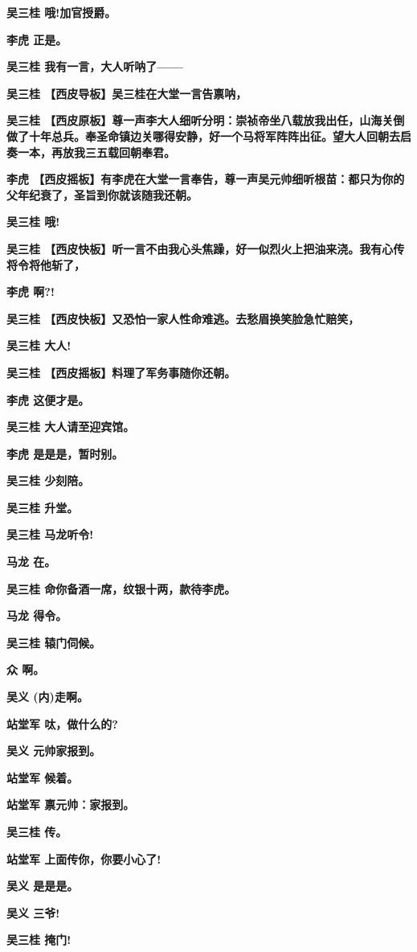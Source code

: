 \textbf{吴三桂 哦!加官授爵。}

\textbf{李虎 正是。}

\textbf{吴三桂 我有一言，大人听呐了------}

\textbf{吴三桂 【西皮导板】吴三桂在大堂一言告禀呐，}

\textbf{吴三桂
【西皮原板】尊一声李大人细听分明：崇祯帝坐八载放我出任，山海关倒做了十年总兵。奉圣命镇边关哪得安静，好一个马将军阵阵出征。望大人回朝去启奏一本，再放我三五载回朝奉君。}

\textbf{李虎
【西皮摇板】有李虎在大堂一言奉告，尊一声吴元帅细听根苗：都只为你的父年纪衰了，圣旨到你就该随我还朝。}

\textbf{吴三桂 哦!}

\textbf{吴三桂
【西皮快板】听一言不由我心头焦躁，好一似烈火上把油来浇。我有心传将令将他斩了，}

\textbf{李虎 啊?!}

\textbf{吴三桂 【西皮快板】又恐怕一家人性命难逃。去愁眉换笑脸急忙赔笑，}

\textbf{吴三桂 大人!}

\textbf{吴三桂 【西皮摇板】料理了军务事随你还朝。}

\textbf{李虎 这便才是。}

\textbf{吴三桂 大人请至迎宾馆。}

\textbf{李虎 是是是，暂时别。}

\textbf{吴三桂 少刻陪。}

\textbf{吴三桂 升堂。}

\textbf{吴三桂 马龙听令!}

\textbf{马龙 在。}

\textbf{吴三桂 命你备酒一席，纹银十两，款待李虎。}

\textbf{马龙 得令。}

\textbf{吴三桂 辕门伺候。}

\textbf{众 啊。}

\textbf{吴义 (内)走啊。}

\textbf{站堂军 呔，做什么的?}

\textbf{吴义 元帅家报到。}

\textbf{站堂军 候着。}

\textbf{站堂军 禀元帅：家报到。}

\textbf{吴三桂 传。}

\textbf{站堂军 上面传你，你要小心了!}

\textbf{吴义 是是是。}

\textbf{吴义 三爷!}

\textbf{吴三桂 掩门!}

